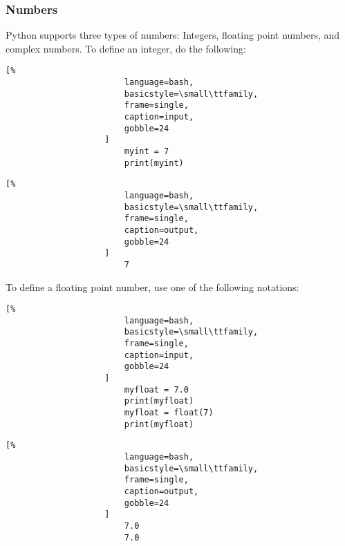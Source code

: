 \documentclass[crop=false,class=book]{standalone}
\begin{document}
            \subsubsection{Numbers}
                Python supports three types of numbers: Integers,
                floating point numbers, and complex numbers.
                To define an integer, do the following:\newline
                \begin{minipage}[t]{.48\textwidth}
                    \centering
                    \begin{lstlisting}[%
                        language=bash,
                        basicstyle=\small\ttfamily,
                        frame=single,
                        caption=input,
                        gobble=24
                    ]
                        myint = 7
                        print(myint)
                    \end{lstlisting}
                \end{minipage}\hfill
                \begin{minipage}[t]{.48\textwidth}
                    \centering
                    \begin{lstlisting}[%
                        language=bash,
                        basicstyle=\small\ttfamily,
                        frame=single,
                        caption=output,
                        gobble=24
                    ]
                        7
                    \end{lstlisting}
                \end{minipage}\newline
                To define a floating point number, use one of the
                following notations:
                \newpage
                \begin{minipage}[t]{.48\textwidth}
                    \centering
                    \begin{lstlisting}[%
                        language=bash,
                        basicstyle=\small\ttfamily,
                        frame=single,
                        caption=input,
                        gobble=24
                    ]
                        myfloat = 7.0
                        print(myfloat)
                        myfloat = float(7)
                        print(myfloat)
                    \end{lstlisting}
                \end{minipage}\hfill
                \begin{minipage}[t]{.48\textwidth}
                    \centering
                    \begin{lstlisting}[%
                        language=bash,
                        basicstyle=\small\ttfamily,
                        frame=single,
                        caption=output,
                        gobble=24
                    ]
                        7.0
                        7.0
                    \end{lstlisting}
                \end{minipage}
\end{document}
